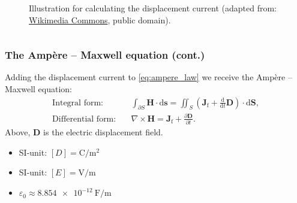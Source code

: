 \begin{frame}
\begin{columns}
\begin{column}{0.4\textwidth}
\begin{figure}
				\caption{Illustration for calculating the displacement current (adapted from: \href{https://commons.wikimedia.org/wiki/File:Maxwell_integral_displacement_current.svg}{Wikimedia Commons}, public domain).}
			\end{figure}
		\end{column}
		\end{columns}
\end{frame}

\begin{frame}
	\frametitle{The Amp\`ere -- Maxwell equation (cont.)}
        Adding the displacement current to \eqref{eq:ampere_law} we receive the Amp\`ere -- Maxwell equation:
            \begin{align}    
            \mbox{Integral form:} \quad  &\int_{\partial S} \bm{H} \cdot \mathrm{d}\bm{s} = \iint_{S}\left(\bm{J}_\mathrm{f} + \frac{\mathrm{d}}{\mathrm{d} t} \bm{D} \right)\cdot\mathrm{d}\bm{S}, \\
            \mbox{Differential form:} \quad &\nabla \times \bm{H} = \bm{J}_\mathrm{f} +  \frac{\partial\bm{D}}{\partial t}. 
            \label{eq:ampere_maxwell_law}
        \end{align}
        Above, $\bm{D}$ is the electric displacement field.
        \vspace{0.5cm}
        \begin{itemize}
            \item SI-unit: $[D] = \si{\coulomb\per\metre\squared}$
            \item SI-unit: $[E] = \si{\volt\per\metre}$
            \item $\varepsilon_0 \approx \SI{8.854e-12}{\farad\per\metre}$
        \end{itemize}
\end{frame}

